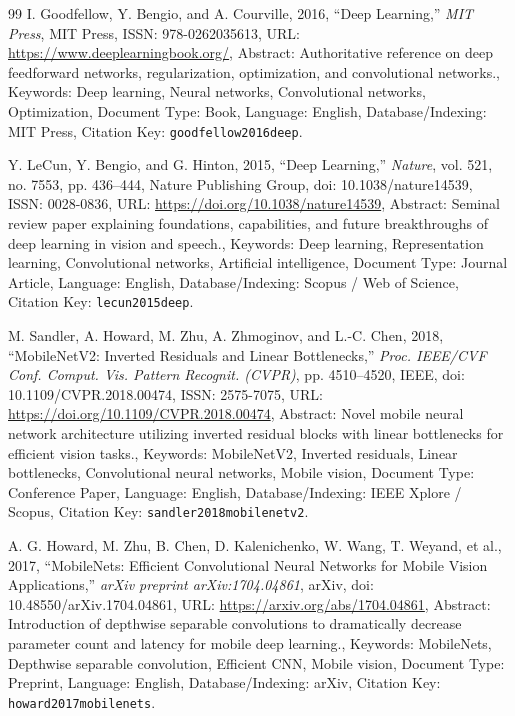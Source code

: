 \documentclass[10pt,a4paper]{article}
\begin{document}
\begin{thebibliography}{99}
I. Goodfellow, Y. Bengio, and A. Courville, 2016, ``Deep Learning,'' \textit{MIT Press}, MIT Press, ISSN: 978-0262035613, URL: \url{https://www.deeplearningbook.org/}, Abstract: Authoritative reference on deep feedforward networks, regularization, optimization, and convolutional networks., Keywords: Deep learning, Neural networks, Convolutional networks, Optimization, Document Type: Book, Language: English, Database/Indexing: MIT Press, Citation Key: \texttt{goodfellow2016deep}.

Y. LeCun, Y. Bengio, and G. Hinton, 2015, ``Deep Learning,'' \textit{Nature}, vol. 521, no. 7553, pp. 436--444, Nature Publishing Group, doi: 10.1038/nature14539, ISSN: 0028-0836, URL: \url{https://doi.org/10.1038/nature14539}, Abstract: Seminal review paper explaining foundations, capabilities, and future breakthroughs of deep learning in vision and speech., Keywords: Deep learning, Representation learning, Convolutional networks, Artificial intelligence, Document Type: Journal Article, Language: English, Database/Indexing: Scopus / Web of Science, Citation Key: \texttt{lecun2015deep}.

M. Sandler, A. Howard, M. Zhu, A. Zhmoginov, and L.-C. Chen, 2018, ``MobileNetV2: Inverted Residuals and Linear Bottlenecks,'' \textit{Proc. IEEE/CVF Conf. Comput. Vis. Pattern Recognit. (CVPR)}, pp. 4510--4520, IEEE, doi: 10.1109/CVPR.2018.00474, ISSN: 2575-7075, URL: \url{https://doi.org/10.1109/CVPR.2018.00474}, Abstract: Novel mobile neural network architecture utilizing inverted residual blocks with linear bottlenecks for efficient vision tasks., Keywords: MobileNetV2, Inverted residuals, Linear bottlenecks, Convolutional neural networks, Mobile vision, Document Type: Conference Paper, Language: English, Database/Indexing: IEEE Xplore / Scopus, Citation Key: \texttt{sandler2018mobilenetv2}.

A. G. Howard, M. Zhu, B. Chen, D. Kalenichenko, W. Wang, T. Weyand, et al., 2017, ``MobileNets: Efficient Convolutional Neural Networks for Mobile Vision Applications,'' \textit{arXiv preprint arXiv:1704.04861}, arXiv, doi: 10.48550/arXiv.1704.04861, URL: \url{https://arxiv.org/abs/1704.04861}, Abstract: Introduction of depthwise separable convolutions to dramatically decrease parameter count and latency for mobile deep learning., Keywords: MobileNets, Depthwise separable convolution, Efficient CNN, Mobile vision, Document Type: Preprint, Language: English, Database/Indexing: arXiv, Citation Key: \texttt{howard2017mobilenets}.


\end{thebibliography}
\end{document}

